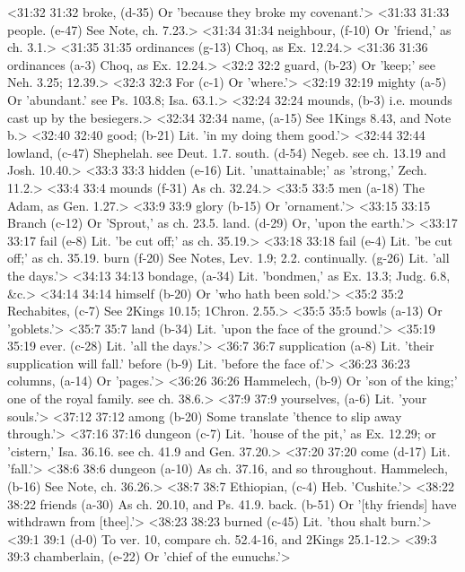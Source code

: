 <31:32 31:32  broke, (d-35)  Or 'because they broke my covenant.'>
<31:33 31:33  people. (e-47)  See Note, ch. 7.23.>
<31:34 31:34  neighbour, (f-10)  Or 'friend,' as ch. 3.1.>
<31:35 31:35  ordinances (g-13)  Choq, as Ex. 12.24.>
<31:36 31:36  ordinances (a-3)  Choq, as Ex. 12.24.>
<32:2 32:2  guard, (b-23)  Or 'keep;' see Neh. 3.25; 12.39.>
<32:3 32:3  For (c-1)  Or 'where.'>
<32:19 32:19  mighty (a-5)  Or 'abundant.' see Ps. 103.8; Isa. 63.1.>
<32:24 32:24  mounds, (b-3)  i.e. mounds cast up by the besiegers.>
<32:34 32:34  name, (a-15)  See 1Kings 8.43, and Note b.>
<32:40 32:40  good; (b-21)  Lit. 'in my doing them good.'>
<32:44 32:44  lowland, (c-47)  Shephelah. see Deut. 1.7.
  south. (d-54)  Negeb. see ch. 13.19 and Josh. 10.40.>
<33:3 33:3  hidden (e-16)  Lit. 'unattainable;' as 'strong,' Zech. 11.2.>
<33:4 33:4  mounds (f-31)  As ch. 32.24.>
<33:5 33:5  men (a-18)  The Adam, as Gen. 1.27.>
<33:9 33:9  glory (b-15)  Or 'ornament.'>
<33:15 33:15  Branch (c-12)  Or 'Sprout,' as ch. 23.5.
  land. (d-29)  Or, 'upon the earth.'>
<33:17 33:17  fail (e-8) Lit. 'be cut off;' as ch. 35.19.>
<33:18 33:18  fail (e-4)  Lit. 'be cut off;' as ch. 35.19.
  burn (f-20)  See Notes, Lev. 1.9; 2.2.
  continually. (g-26)  Lit. 'all the days.'>
<34:13 34:13  bondage, (a-34)  Lit. 'bondmen,' as Ex. 13.3; Judg. 6.8, &c.>
<34:14 34:14  himself (b-20)  Or 'who hath been sold.'>
<35:2 35:2  Rechabites, (c-7)  See 2Kings 10.15; 1Chron. 2.55.>
<35:5 35:5  bowls (a-13)  Or 'goblets.'>
<35:7 35:7  land (b-34)  Lit. 'upon the face of the ground.'>
<35:19 35:19  ever. (c-28)  Lit. 'all the days.'>
<36:7 36:7  supplication (a-8)  Lit. 'their supplication will fall.'
  before (b-9)  Lit. 'before the face of.'>
<36:23 36:23  columns, (a-14)  Or 'pages.'>
<36:26 36:26  Hammelech, (b-9)  Or 'son of the king;' one of the royal family. see ch. 38.6.>
<37:9 37:9  yourselves, (a-6)  Lit. 'your souls.'>
<37:12 37:12  among (b-20)  Some translate 'thence to slip away through.'>
<37:16 37:16  dungeon (c-7)  Lit. 'house of the pit,' as Ex. 12.29; or 'cistern,' Isa. 36.16. see ch. 41.9 and Gen. 37.20.>
<37:20 37:20  come (d-17)  Lit. 'fall.'>
<38:6 38:6  dungeon (a-10)  As ch. 37.16, and so throughout.
  Hammelech, (b-16)  See Note, ch. 36.26.>
<38:7 38:7  Ethiopian, (c-4)  Heb. 'Cushite.'>
<38:22 38:22  friends (a-30)  As ch. 20.10, and Ps. 41.9.
  back. (b-51)  Or '[thy friends] have withdrawn from [thee].'>
<38:23 38:23  burned (c-45)  Lit. 'thou shalt burn.'>
<39:1 39:1   (d-0)  To ver. 10, compare ch. 52.4-16, and 2Kings 25.1-12.>
<39:3 39:3  chamberlain, (e-22)  Or 'chief of the eunuchs.'>
